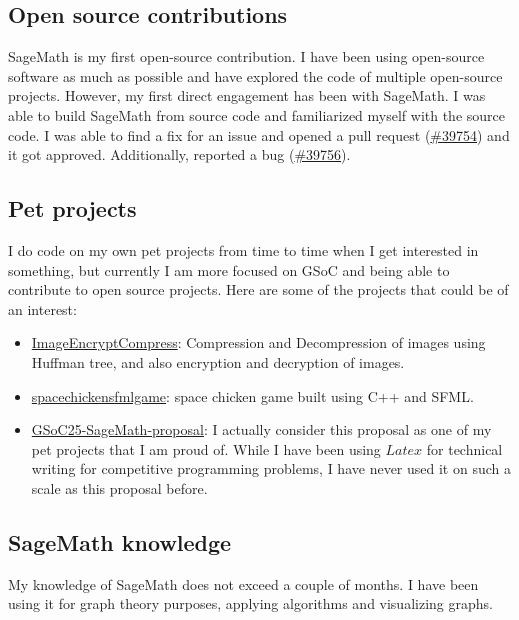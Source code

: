 \subsection{Open source contributions}
SageMath is my first open-source contribution. I have been using open-source
software as much as possible and have explored the code of multiple open-source
projects. However, my first direct engagement has been with SageMath. I was
able to build SageMath from source code and familiarized myself with the source
code. I was able to find a fix for an issue and opened a pull request
(\href{https://github.com/sagemath/sage/pull/39754}{\#39754}) and it got
approved. Additionally, reported a bug
(\href{https://github.com/sagemath/sage/issues/39756}{\#39756}).\\

\subsection{Pet projects}
I do code on my own pet projects from time to time when I get interested in
something, but currently I am more focused on GSoC and being able to contribute
to open source projects. Here are some of the projects that could be of an
interest:
\begin{itemize}
      \item \href{https://github.com/zezoo050/ImageEncryptCompress}{ImageEncryptCompress}: Compression and Decompression of images using Huffman tree, and also encryption and decryption of images.
      \item \href{https://github.com/zezoo050/spacechickensfmlgame}{spacechickensfmlgame}: space chicken game built using C++ and SFML.
      \item \href{https://github.com/zezoo050/GSoC25-SageMath-proposal}{GSoC25-SageMath-proposal}: I actually consider this proposal as one of my pet projects that I am proud of. 
      While I have been using $Latex$ for technical writing for competitive programming problems, I have never used it on such a scale as this proposal before.
\end{itemize}


\subsection{SageMath knowledge}
My knowledge of SageMath does not exceed a couple of months. I have been using
it for graph theory purposes, applying algorithms and visualizing graphs.

